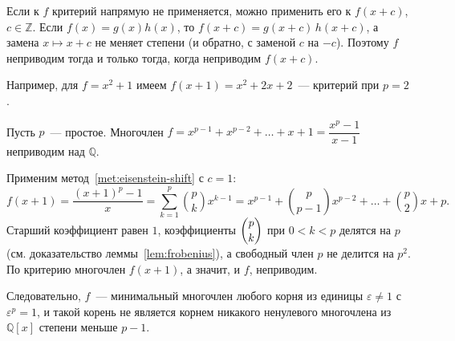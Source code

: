 \documentclass[12pt]{article}
\begin{document}
	\begin{method}\label{met:eisenstein-shift}
		Если к $f$ критерий напрямую не применяется, можно применить его к $f(x + c)$, $c \in \mathbb{Z}$. Если $f(x) = g(x)h(x)$, то $f(x + c) = g(x + c)\,h(x + c)$, а замена $x \mapsto x + c$ не меняет степени (и обратно, с заменой $c$ на $-c$). Поэтому $f$ неприводим тогда и только тогда, когда неприводим $f(x + c)$.

		Например, для $f = x^2 + 1$ имеем $f(x + 1) = x^2 + 2x + 2$~--- критерий при $p = 2$.
	\end{method}

	\begin{example}\label{ex:eisenstein-cyclotomic}
		Пусть $p$~--- простое. Многочлен $f = x^{p-1} + x^{p-2} + \dots + x + 1 = \dfrac{x^p - 1}{x - 1}$ неприводим над $\mathbb{Q}$.

		Применим метод~\ref{met:eisenstein-shift} с $c = 1$:
		\[
			f(x + 1) = \frac{(x + 1)^p - 1}{x} = \sum_{k=1}^{p} \binom{p}{k} x^{k-1} = x^{p-1} + \binom{p}{p-1}x^{p-2} + \dots + \binom{p}{2}x + p.
		\]
		Старший коэффициент равен $1$, коэффициенты $\dbinom{p}{k}$ при $0 < k < p$ делятся на $p$ (см. доказательство леммы~\ref{lem:frobenius}), а свободный член $p$ не делится на $p^2$. По критерию многочлен $f(x + 1)$, а значит, и $f$, неприводим.

		Следовательно, $f$~--- минимальный многочлен любого корня из единицы $\varepsilon \ne 1$ с $\varepsilon^p = 1$, и такой корень не является корнем никакого ненулевого многочлена из $\mathbb{Q}[x]$ степени меньше $p - 1$.
	\end{example}
\end{document}
